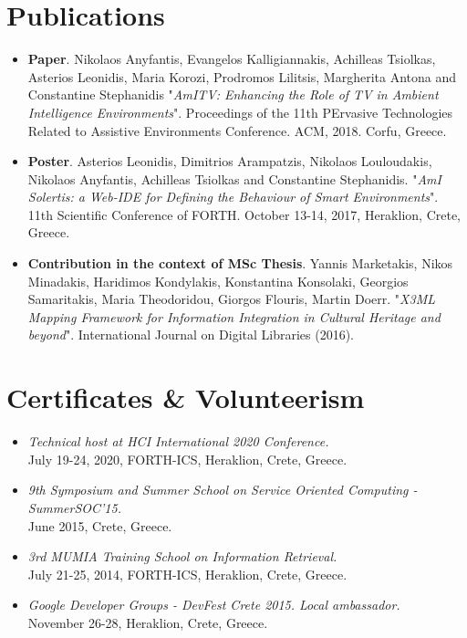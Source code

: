 \documentclass[11pt]{article}
\begin{document}
\section{Publications}

\begin{itemize}

\item 
\textbf{Paper}. 
Nikolaos Anyfantis, Evangelos Kalligiannakis, Achilleas Tsiolkas, Asterios Leonidis, Maria Korozi, Prodromos Lilitsis, Margherita Antona and Constantine Stephanidis "\textit{AmITV: Enhancing the Role of TV in Ambient Intelligence Environments}". Proceedings of the 11th PErvasive Technologies Related to Assistive Environments Conference. ACM, 2018. Corfu, Greece.

\item 
\textbf{Poster}.
Asterios Leonidis, Dimitrios Arampatzis, Nikolaos Louloudakis, Nikolaos Anyfantis, Achilleas Tsiolkas and Constantine Stephanidis. "\textit{AmI Solertis: a Web-IDE for Defining the Behaviour of Smart Environments}". 11th Scientific Conference of FORTH. October 13-14, 2017, Heraklion, Crete, Greece.

\item 
\textbf{Contribution in the context of MSc Thesis}. 
Yannis Marketakis, Nikos Minadakis, Haridimos Kondylakis, Konstantina Konsolaki, Georgios Samaritakis, Maria Theodoridou, Giorgos Flouris, Martin Doerr. "\textit{X3ML Mapping Framework for Information Integration in Cultural Heritage and beyond}". International Journal on Digital Libraries (2016).

\end{itemize}

\section{Certificates \& Volunteerism}

\begin{itemize}

\item
\textit{Technical host at HCI International 2020 Conference.} \\
July 19-24, 2020, FORTH-ICS, Heraklion, Crete, Greece.

\item
\textit{9th Symposium and Summer School on Service Oriented Computing - SummerSOC'15.} \\
June 2015, Crete, Greece.

\item
\textit{3rd MUMIA Training School on Information Retrieval.} \\
July 21-25, 2014, FORTH-ICS, Heraklion, Crete, Greece.

\item
\textit{Google Developer Groups - DevFest Crete 2015. Local ambassador.} \\
November 26-28, Heraklion, Crete, Greece.

\end{itemize}
\end{document}
